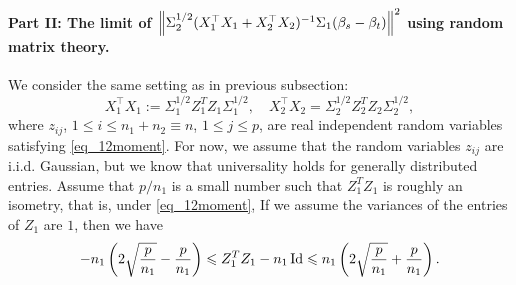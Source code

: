 \paragraph{Part II: The limit of $\left\| \Sigma_2^{1/2} (X_1^{\top}X_1 + X_2^{\top}X_2)^{-1}\Sigma_1 (\beta_s - \beta_t) \right\|^2$ using random matrix theory.}
We consider the same setting as in previous subsection: 
$$ X_1^{\top}X_1:=\Sigma_1^{1/2}  Z_1^T Z_1 \Sigma_1^{1/2} ,\quad X_2^{\top}X_2= \Sigma_2^{1/2}  Z_2^T Z_2 \Sigma_2^{1/2},$$
where $z_{ij}$, $1 \leq i \leq n_1+n_2\equiv n$, $1 \leq j \leq p$, are real independent random variables satisfying \eqref{eq_12moment}. For now, we assume that the random variables $z_{ij}$ are i.i.d. Gaussian, but we know that universality holds for generally distributed entries. Assume that $p/n_1$ is a small number such that $Z_1^TZ_1$ is roughly an isometry, that is, under \eqref{eq_12moment}, 
{\color{blue}
If we assume the variances of the entries of $Z_1$ are $1$, then we have
\begin{align}
- {n_1} \left(2\sqrt{\frac{p}{n_1}} - {\frac{p}{n_1}}\right)  \leqslant {Z_1^T Z_1 -  n_1 \operatorname{Id}}  \leqslant {n_1} \left(2\sqrt{\frac{p}{n_1}} + {\frac{p}{n_1}}\right) . \label{eq_isometric}
\end{align}
}

